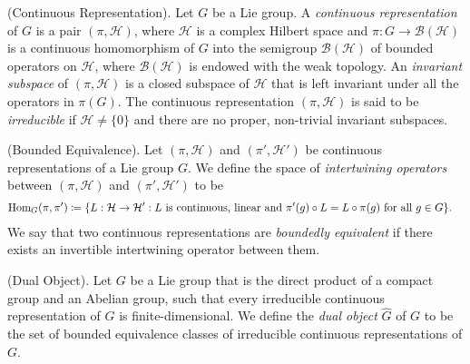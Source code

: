 \noindent\begin{definition}\textup{(Continuous Representation).} Let $G$ be a Lie group. A {\em continuous representation} of $G$ is a pair $(\pi, \mathcal{H})$, where $\mathcal{H}$ is a complex Hilbert space and $\pi : G \to \mathcal{B}(\mathcal{H})$ is a continuous homomorphism of $G$ into the semigroup $\mathcal{B}(\mathcal{H})$ of bounded operators on $\mathcal{H}$, where $\mathcal{B}(\mathcal{H})$ is endowed with the weak topology. An {\em invariant subspace} of $(\pi, \mathcal{H})$ is a closed subspace of $\mathcal{H}$ that is left invariant under all the operators in $\pi(G)$. The continuous representation $(\pi, \mathcal{H})$ is said to be {\em irreducible} if $\mathcal{H} \neq \{0\}$ and there are no proper, non-trivial invariant subspaces.\newpage
\end{definition}

\noindent\begin{definition}\textup{(Bounded Equivalence).} Let $(\pi, \mathcal{H})$ and $(\pi', \mathcal{H}')$ be continuous representations of a Lie group $G$. We define the space of {\em intertwining operators} between $(\pi, \mathcal{H})$ and $(\pi', \mathcal{H}')$ to be
\begin{align*}
\begin{split}
\homset_G(\pi, \pi') %
&\coloneqq \{L : \mathcal{H} \to \mathcal{H}' : \textup{$L$ is continuous, linear and $\pi'(g) \circ L = L \circ \pi(g)$ for all $g \in G$}\}.
\end{split}
\end{align*}
We say that two continuous representations are {\em boundedly equivalent} if there exists an invertible intertwining operator between them.\\
\end{definition}

\noindent\begin{definition}\textup{(Dual Object).} Let $G$ be a Lie group that is the direct product of a compact group and an Abelian group, such that every irreducible continuous representation of $G$ is finite-dimensional. We define the {\em dual object} $\widehat{G}$ of $G$ to be the set of bounded equivalence classes of irreducible continuous representations of $G$.\\
\end{definition}

